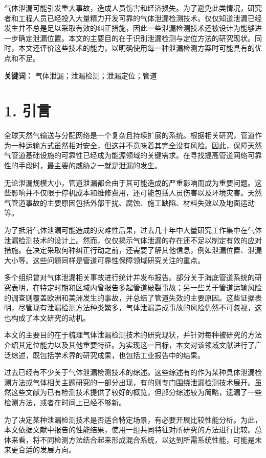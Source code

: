 气体泄漏可能引发重大事故，造成人员伤害和经济损失。为了避免此类情况，研究者和工程人员已经投入大量精力开发可靠的气体泄漏检测技术。仅仅知道泄漏已经发生并不总是足以采取有效的纠正措施，因此一些泄漏检测技术还被设计为能够进一步确定泄漏位置。本文的主要目的在于识别泄漏检测与定位方法的研究现状。同时，本文还评价这些技术的能力，以明确使用每一种泄漏检测方案时可能具有的优点和不足。

\noindent\textbf{关键词：} 气体泄漏；泄漏检测；泄漏定位；管道

\section*{1. 引言}

全球天然气输送与分配网络是一个复杂且持续扩展的系统。根据相关研究，管道作为一种运输方式虽然相对安全，但这并不意味着其完全没有风险。因此，保障天然气管道基础设施的可靠性已经成为能源领域的关键需求。在寻找提高管道网络可靠性的手段时，最主要的威胁之一就是泄漏的发生。

无论泄漏规模大小，管道泄漏都会由于其可能造成的严重影响而成为重要问题。这些影响并不仅限于停机成本和维修费用，还可能包括人员伤害以及环境灾害。天然气管道事故的主要原因包括外部干扰、腐蚀、施工缺陷、材料失效以及地面运动等。

为了抵消气体泄漏可能造成的灾难性后果，过去几十年中大量研究工作集中在气体泄漏检测技术的设计上。然而，仅仅揭示气体泄漏的存在还不足以制定有效的应对措施。在决定采取何种纠正行动之前，还需要了解其他信息，例如泄漏位置、泄漏大小等。这些问题同样是管道可靠性保障领域研究关注的重点。

多个组织曾对气体泄漏相关事故进行统计并发布报告。部分关于海底管道系统的研究表明，在特定时期和区域内曾报告多起管道破裂事故；另一些关于管道运输风险的调查则覆盖欧洲和美洲发生的事故，并总结了管道失效的主要原因。这些证据表明，尽管现有泄漏检测方法种类繁多，气体泄漏造成事故的风险仍然不可忽视，这也构成了本文研究的动机。

本文的主要目的在于梳理气体泄漏检测技术的研究现状，并针对每种被研究的方法介绍其定位能力以及其他重要特征。为实现这一目标，本文对该领域文献进行了广泛综述，既包括学术界的研究成果，也包括工业报告中的结果。

过去已经有不少关于气体泄漏检测技术的综述。这些综述有的作为某种具体泄漏检测方法或气体相关主题研究的一部分出现，有的则专门围绕泄漏检测技术展开。虽然这些文献为已有检测技术提供了较好的概览，但部分综述较为简略，遗漏了一些检测方法，或者在时间上已经不够新。

为了决定某种泄漏检测技术是否适合特定场景，有必要开展比较性能分析。为此，本文依据文献中报告的性能结果，使用一组共同特征对所研究的方法进行比较。总体来看，将不同检测方法结合起来形成混合系统，以达到所需系统性能，可能是未来更合适的发展方向。


